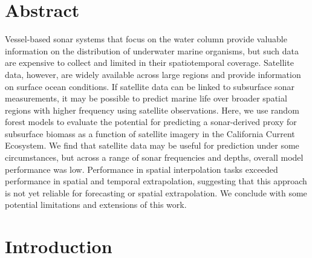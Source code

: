 \documentclass[10pt,letterpaper]{article}
\begin{document}
\section*{Abstract}
Vessel-based sonar systems that focus on the water column provide valuable information on the distribution of underwater marine organisms, but such data are expensive to collect and limited in their spatiotemporal coverage. 
Satellite data, however, are widely available across large regions and provide information on surface ocean conditions. 
If satellite data can be linked to subsurface sonar measurements, it may be possible to predict marine life over broader spatial regions with higher frequency using satellite observations.
Here, we use random forest models to evaluate the potential for predicting a sonar-derived proxy for subsurface biomass as a function of satellite imagery in the California Current Ecosystem. 
We find that satellite data may be useful for prediction under some circumstances, but across a range of sonar frequencies and depths, overall model performance was low. 
Performance in spatial interpolation tasks exceeded performance in spatial and temporal extrapolation, suggesting that this approach is not yet reliable for forecasting or spatial extrapolation. 
We conclude with some potential limitations and extensions of this work.

\linenumbers

\section*{Introduction}
\end{document}
